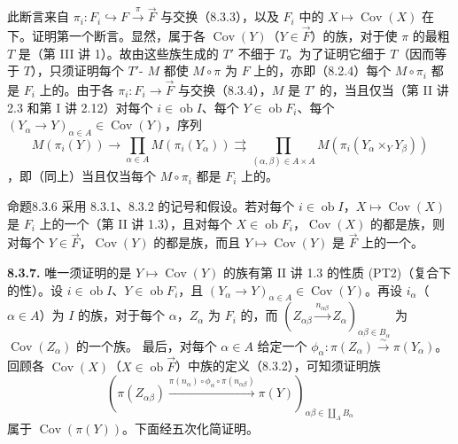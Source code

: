 此断言来自 $\pi_i:F_i\hookrightarrow F\xrightarrow\pi\overrightarrow F$ 与交换（8.3.3），以及 $F_i$ 中的 $X\mapsto\operatorname{Cov}(X)$ 在下。证明第一个断言。显然，属于各 $\operatorname{Cov}(Y)$（$Y\in\overrightarrow F$）的族，对于使 $\pi$ 的最粗 $T$ 是（第 III 讲 1）。故由这些族生成的 $T'$ 不细于 $T$。为了证明它细于 $T$（因而等于 $T$），只须证明每个 $T'$- $M$ 都使 $M\circ\pi$ 为 $F$ 上的，亦即（8.2.4）每个 $M\circ\pi_i$ 都是 $F_i$ 上的。由于各 $\pi_i:F_i\to\overrightarrow F$ 与交换（8.3.4），$M$ 是 $T'$ 的，当且仅当（第 II 讲 2.3 和第 I 讲 2.12）对每个 $i\in\operatorname{ob}I$、每个 $Y\in\operatorname{ob}F_i$、每个 $(Y_\alpha\to Y)_{\alpha\in A}\in\operatorname{Cov}(Y)$，序列
\[M(\pi_i(Y))\longrightarrow\prod_{\alpha\in A}M(\pi_i(Y_\alpha))\rightrightarrows\prod_{(\alpha,\beta)\in A\times A}M(\pi_i(Y_\alpha\times_Y Y_\beta))\]
，即（同上）当且仅当每个 $M\circ\pi_i$ 都是 $F_i$ 上的。

\begin{SGAresult}{命题}{8.3.6}
采用 8.3.1、8.3.2 的记号和假设。若对每个 $i\in\operatorname{ob}I$，$X\mapsto\operatorname{Cov}(X)$ 是 $F_i$ 上的一个（第 II 讲 1.3），且对每个 $X\in\operatorname{ob}F_i$，$\operatorname{Cov}(X)$ 的都是族，则对每个 $Y\in\overrightarrow F$，$\operatorname{Cov}(Y)$ 的都是族，而且 $Y\mapsto\operatorname{Cov}(Y)$ 是 $\overrightarrow F$ 上的一个。
\end{SGAresult}
\textbf{8.3.7.} 唯一须证明的是 $Y\mapsto\operatorname{Cov}(Y)$ 的族有第 II 讲 1.3 的性质 (PT2)（复合下的性）。设 $i\in\operatorname{ob}I$、$Y\in\operatorname{ob}F_i$，且 $(Y_\alpha\to Y)_{\alpha\in A}\in\operatorname{Cov}(Y)$。再设 $i_\alpha$（$\alpha\in A$）为 $I$ 的族，对于每个 $\alpha$，$Z_\alpha$ 为 $F_i$ 的，而 $(Z_{\alpha\beta}\xrightarrow{n_{\alpha\beta}}Z_\alpha)_{\alpha\beta\in B_\alpha}$ 为 $\operatorname{Cov}(Z_\alpha)$ 的一个族。
最后，对每个 $\alpha\in A$ 给定一个 $\phi_\alpha:\pi(Z_\alpha)\xrightarrow\sim\pi(Y_\alpha)$。回顾各 $\operatorname{Cov}(X)$（$X\in\operatorname{ob}\overrightarrow F$）中族的定义（8.3.2），可知须证明族
\[\left(\pi(Z_{\alpha\beta})\xrightarrow{\pi(n_\alpha)\circ\phi_\alpha\circ\pi(n_{\alpha\beta})}\pi(Y)\right)_{\alpha\beta\in\coprod_A B_\alpha}\]
属于 $\operatorname{Cov}(\pi(Y))$。下面经五次化简证明。

